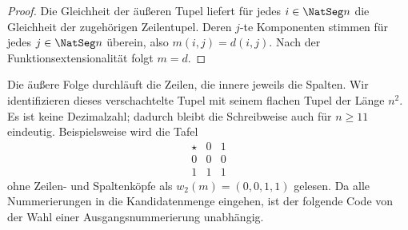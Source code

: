 \documentclass[main.tex]{subfiles}
\begin{document}

\begin{proof}
Die Gleichheit der äußeren Tupel liefert für jedes \(i\in\NatSeg n\) die
Gleichheit der zugehörigen Zeilentupel.  Deren \(j\)-te Komponenten stimmen
für jedes \(j\in\NatSeg n\) überein, also \(m(i,j)=d(i,j)\).  Nach der
Funktionsextensionalität folgt \(m=d\).
\end{proof}

Die äußere Folge durchläuft die Zeilen, die innere jeweils die Spalten.  Wir
identifizieren dieses verschachtelte Tupel mit seinem flachen Tupel der Länge
\(n^2\).  Es ist keine Dezimalzahl; dadurch bleibt die Schreibweise auch für
\(n\geq11\) eindeutig.  Beispielsweise wird die
Tafel
\[
\begin{array}{c|cc}
\star&0&1\\\hline
0&0&0\\
1&1&1
\end{array}
\]
ohne Zeilen- und Spaltenköpfe als \(w_2(m)=(0,0,1,1)\) gelesen.  Da alle
Nummerierungen in die Kandidatenmenge eingehen, ist der folgende Code von der
Wahl einer Ausgangsnummerierung unabhängig.

\end{document}
